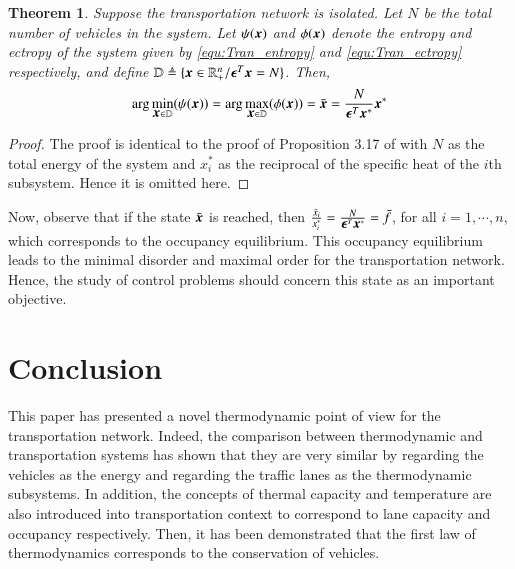 \documentclass[preprint,authoryear,12pt]{elsarticle}
\renewcommand{\vec}[1]{\mbox{\boldmath$#1$}}
\newtheorem{thm}{Theorem}
\begin{document}
\begin{thm}\label{thm:entropy_equilibrium}
Suppose the transportation network is isolated. Let $N$ be the total
number of vehicles in the system. Let $\psi(\vec{x})$ and
$\phi(\vec{x})$ denote the entropy and ectropy of the system  given
by \eqref{equ:Tran_entropy} and \eqref{equ:Tran_ectropy}
respectively, and define $\mathbb{D}\triangleq
\{\vec{x}\in\mathbb{R}^n_+/\vec{\epsilon}^T\vec{x}=N\}$. Then,
\begin{equation}\label{equ:entropy_equilibrium}
\arg\min_{\vec{x}\in\mathbb{D}}(\psi(\vec{x})) =
\arg\max_{\vec{x}\in\mathbb{D}}(\phi(\vec{x})) = \bar{\vec{x}} =
\frac{N}{\vec{\epsilon}^T\vec{x}^*}\vec{x}^*
\end{equation}
\end{thm}
\begin{proof}  The proof is identical to the proof of Proposition 3.17 of \citet{haddad_thermodynamic_2005} with $N$ as the total energy of the system 
and $x^*_i$ as the reciprocal of the specific heat of the $i$th subsystem. Hence it is omitted here.
\end{proof}%

Now, observe that if the state $ \bar{\vec{x}}$ is reached, then
$\frac{\bar{x}_i}{x_i^*}=\frac{N}{\vec{\epsilon}^T\vec{x}^*}=\bar{f}$,
for all $i=1,\cdots, n$, which corresponds to the occupancy
equilibrium. This occupancy equilibrium leads to the minimal disorder
and maximal order for the transportation network. Hence, the study of
control problems should concern this state as an important objective.

\section{Conclusion}

This paper has presented a novel thermodynamic point of view for the
transportation network. Indeed, the comparison between thermodynamic
and transportation systems has shown that they are very similar by
regarding the vehicles as the energy and regarding the traffic lanes
as the thermodynamic subsystems. In addition, the concepts of thermal
capacity and temperature are also introduced into transportation
context to correspond to lane capacity and occupancy respectively.
Then, it has been demonstrated that the first law of thermodynamics
corresponds to the conservation of vehicles.
\end{document}
